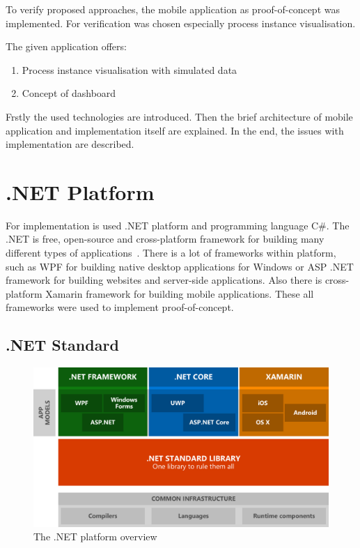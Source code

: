 To verify proposed approaches, the mobile application as proof-of-concept was implemented. For verification was chosen especially process instance visualisation.

The given application offers:
\begin{enumerate}
\item Process instance visualisation with simulated data
\item Concept of dashboard
\end{enumerate}

Frstly the used technologies are introduced. Then the brief architecture of mobile application and implementation itself are explained. In the end, the issues with implementation are described. 
\section{.NET Platform}

For implementation is used .NET platform and programming language C\#. The .NET is free, open-source and cross-platform framework for building many different types of applications~\cite{what-is-dotnet}. There is a lot of frameworks within platform, such as WPF for building native desktop applications for Windows or ASP .NET framework for building websites and server-side applications. Also there is cross-platform Xamarin framework for building mobile applications. These all frameworks were used to implement proof-of-concept. 
\subsection{.NET Standard}
\begin{figure}[ht!]
\centering
\includegraphics[width=12cm,keepaspectratio]{img/dotnet-overview}
\caption{The .NET platform overview \cite{introducing-dotnet-standard}}
\label{fig:dotnet-overview}
\end{figure}

